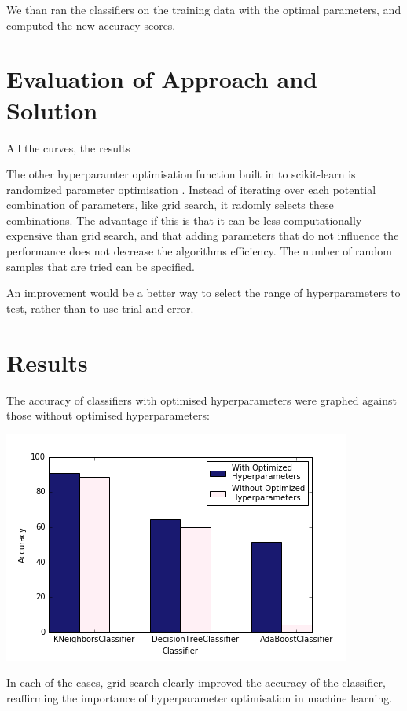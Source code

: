 \documentclass{article}
\begin{document}
	We than ran the classifiers on the training data with the optimal parameters, and computed the new accuracy scores. 

\newpage

\section{Evaluation of Approach and Solution} 
	All the curves, the results


	The other hyperparamter optimisation function built in to  scikit-learn is randomized parameter optimisation \cite{gridsearch}. Instead of iterating over each potential combination of parameters, like grid search, it radomly selects these combinations. The advantage if this is that it can be less computationally expensive than grid search, and that adding parameters that do not influence the performance does not decrease the algorithms efficiency. The number of random samples that are tried can be specified.

	An improvement would be a better way to select the range of hyperparameters to test, rather than to use trial and error.

\newpage
\section{Results}

The accuracy of classifiers with optimised hyperparameters were graphed against those without optimised hyperparameters:

\includegraphics[scale=0.7]{acc_class}

In each of the cases, grid search clearly improved the accuracy of the classifier, reaffirming the importance of hyperparameter optimisation in machine learning. 
\end{document}
